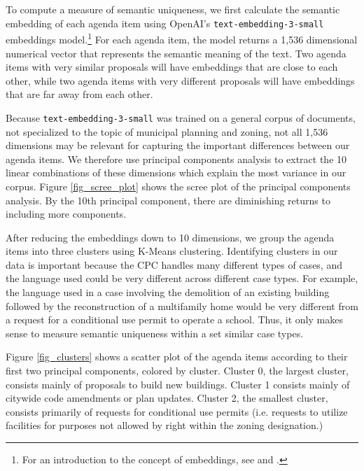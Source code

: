 To compute a measure of semantic uniqueness, we first calculate the semantic embedding of each agenda item using OpenAI's \texttt{text-embedding-3-small} embeddings model.\footnote{For an introduction to the concept of embeddings, see \citet{mikolov2013} and \citet{le2014}.} For each agenda item, the model returns a 1,536 dimensional numerical vector that represents the semantic meaning of the text. Two agenda items with very similar proposals will have embeddings that are close to each other, while two agenda items with very different proposals will have embeddings that are far away from each other. 

Because \texttt{text-embedding-3-small} was trained on a general corpus of documents, not specialized to the topic of municipal planning and zoning, not all 1,536 dimensions may be relevant for capturing the important differences between our agenda items. We therefore use principal components analysis to extract the 10 linear combinations of these dimensions which explain the most variance in our corpus. Figure \ref{fig_scree_plot} shows the scree plot of the principal components analysis. By the 10th principal component, there are diminishing returns to including more components.

After reducing the embeddings down to 10 dimensions, we group the agenda items into three clusters using K-Means clustering. Identifying clusters in our data is important because the CPC handles many different types of cases, and the language used could be very different across different case types. For example, the language used in a case involving the demolition of an existing building followed by the reconstruction of a multifamily home would be very different from a request for a conditional use permit to operate a school. Thus, it only makes sense to measure semantic uniqueness within a set similar case types.

Figure \ref{fig_clusters} shows a scatter plot of the agenda items according to their first two principal components, colored by cluster. Cluster 0, the largest cluster, consists mainly of proposals to build new buildings. Cluster 1 consists mainly of citywide code amendments or plan updates. Cluster 2, the smallest cluster, consists primarily of requests for conditional use permits (i.e. requests to utilize facilities for purposes not allowed by right within the zoning designation.)

